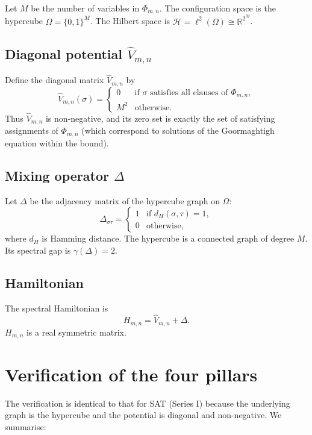 \documentclass[11pt,a4paper]{article}
\begin{document}
Let \(M\) be the number of variables in \(\Phi_{m,n}\). The configuration space is the hypercube \(\Omega = \{0,1\}^M\). The Hilbert space is \(\mathcal{H} = \ell^2(\Omega) \cong \mathbb{R}^{2^M}\).

\subsection{Diagonal potential \(\hat{V}_{m,n}\)}
Define the diagonal matrix \(\hat{V}_{m,n}\) by
\[
\hat{V}_{m,n}(\sigma) = \begin{cases}
0 & \text{if }\sigma\text{ satisfies all clauses of } \Phi_{m,n},\\
M^2 & \text{otherwise}.
\end{cases}
\]
Thus \(\hat{V}_{m,n}\) is non‑negative, and its zero set is exactly the set of satisfying assignments of \(\Phi_{m,n}\) (which correspond to solutions of the Goormaghtigh equation within the bound).

\subsection{Mixing operator \(\Delta\)}
Let \(\Delta\) be the adjacency matrix of the hypercube graph on \(\Omega\):
\[
\Delta_{\sigma\tau} = \begin{cases}
1 & \text{if } d_H(\sigma,\tau)=1,\\
0 & \text{otherwise},
\end{cases}
\]
where \(d_H\) is Hamming distance. The hypercube is a connected graph of degree \(M\). Its spectral gap is \(\gamma(\Delta)=2\).

\subsection{Hamiltonian}
The spectral Hamiltonian is
\[
H_{m,n} = \hat{V}_{m,n} + \Delta.
\]
\(H_{m,n}\) is a real symmetric matrix.

\section{Verification of the four pillars}

The verification is identical to that for SAT (Series I) because the underlying graph is the hypercube and the potential is diagonal and non‑negative. We summarise:
\end{document}
